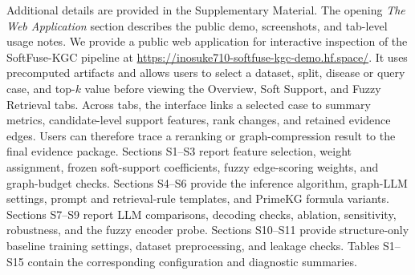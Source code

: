 \documentclass[pdflatex,sn-mathphys-num]{sn-jnl}
\newcommand{\softfuse}{SoftFuse-KGC}
\begin{document}

\backmatter


Additional details are provided in the Supplementary Material. The opening \textit{The Web Application} section describes the public demo, screenshots, and tab-level usage notes. We provide a public web application for interactive inspection of the \softfuse{} pipeline at \url{https://inosuke710-softfuse-kgc-demo.hf.space/}. It uses precomputed artifacts and allows users to select a dataset, split, disease or query case, and top-\(k\) value before viewing the Overview, Soft Support, and Fuzzy Retrieval tabs. Across tabs, the interface links a selected case to summary metrics, candidate-level support features, rank changes, and retained evidence edges. Users can therefore trace a reranking or graph-compression result to the final evidence package. Sections S1--S3 report feature selection, weight assignment, frozen soft-support coefficients, fuzzy edge-scoring weights, and graph-budget checks. Sections S4--S6 provide the inference algorithm, graph-LLM settings, prompt and retrieval-rule templates, and PrimeKG formula variants. Sections S7--S9 report LLM comparisons, decoding checks, ablation, sensitivity, robustness, and the fuzzy encoder probe. Sections S10--S11 provide structure-only baseline training settings, dataset preprocessing, and leakage checks.  Tables S1--S15 contain the corresponding configuration and diagnostic summaries. 

\end{document}

